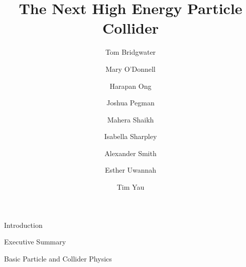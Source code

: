 \documentclass[12pt]{article}
\begin{document}
    \begin{titlepage}
    
     \author{
         Tom Bridgwater \and
         Mary O'Donnell \and
         Harapan Ong \and
         Joshua Pegman \and
         Mahera Shaikh \and
         Isabella Sharpley \and
         Alexander Smith \and
         Esther Uwannah \and
         Tim Yau
     }
     
     \title{The Next High Energy Particle Collider}
     
     \maketitle
     
    
    \end{titlepage}
 
 \clearpage
 
 \setcounter{tocdepth}{2}
 \tableofcontents
 
 \clearpage
 
 \begin{section}{Introduction}
     
 \end{section}
 
 \begin{section}{Executive Summary}
 	 
 \end{section}

 \begin{section}{Basic Particle and Collider Physics}
     
     
 \end{section}
 
\end{document}
